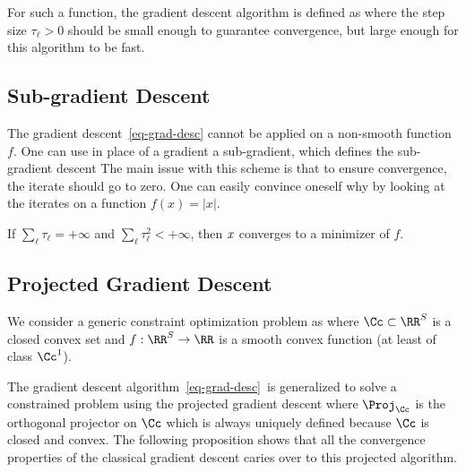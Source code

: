 For such a function, the gradient descent algorithm is defined as
where the step size $\tau_\ell>0$ should be small enough to guarantee convergence, but large enough for this algorithm to be fast.


\subsection{Sub-gradient Descent}

The gradient descent~\eqref{eq-grad-desc} cannot be applied on a non-smooth function $f$. One can use in place of a gradient a sub-gradient, which defines the sub-gradient descent
The main issue with this scheme is that to ensure convergence, the iterate should go to zero. One can easily convince oneself why by looking at the iterates on a function $f(x)=|x|$.

\begin{thm}
	If $\sum_{\ell} \tau_\ell=+\infty$ and $\sum_{\ell} \tau_\ell^2 < +\infty$, then $\it{x}$ converges to a minimizer of $f$. 
\end{thm}

\subsection{Projected Gradient Descent}
\label{sec-proj-grad}

We consider a generic constraint optimization problem as
where $\Cc \subset \RR^S$ is a closed convex set and $f : \RR^S \rightarrow \RR$ is a smooth convex function (at least of class $\Cc^1$). 

The gradient descent algorithm~\eqref{eq-grad-desc} is generalized to solve a constrained problem using the projected gradient descent 
where $\Proj_\Cc$ is the orthogonal projector on $\Cc$
which is always uniquely defined because $\Cc$ is closed and convex.
%
The following proposition shows that all the convergence properties of the classical gradient descent caries over to this projected algorithm.

